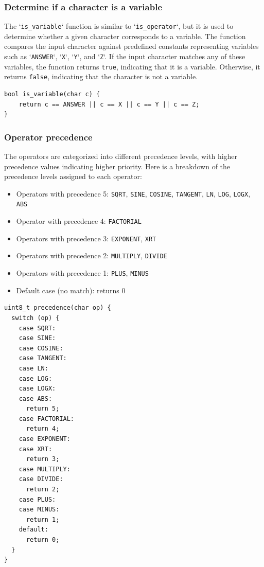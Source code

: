 \documentclass[a4paper, twoside]{report}
\begin{document}
\subsubsection{Determine if a character is a variable}
The `\texttt{is\_variable}` function is similar to `\texttt{is\_operator}`, but it is used to determine whether a given character corresponds to a variable. The function compares the input character against predefined constants representing variables such as `\texttt{ANSWER}`, `\texttt{X}`, `\texttt{Y}`, and `\texttt{Z}`. If the input character matches any of these variables, the function returns \texttt{true}, indicating that it is a variable. Otherwise, it returns \texttt{false}, indicating that the character is not a variable.
\begin{verbatim}
bool is_variable(char c) {
	return c == ANSWER || c == X || c == Y || c == Z;
}
\end{verbatim}

\subsubsection{Operator precedence}
The operators are categorized into different precedence levels, with higher precedence values indicating higher priority. Here is a breakdown of the precedence levels assigned to each operator:

\begin{itemize}
    \item Operators with precedence 5: \texttt{SQRT}, \texttt{SINE}, \texttt{COSINE}, \texttt{TANGENT}, \texttt{LN}, \texttt{LOG}, \texttt{LOGX}, \texttt{ABS}
    \item Operator with precedence 4: \texttt{FACTORIAL}
    \item Operators with precedence 3: \texttt{EXPONENT}, \texttt{XRT}
    \item Operators with precedence 2: \texttt{MULTIPLY}, \texttt{DIVIDE}
    \item Operators with precedence 1: \texttt{PLUS}, \texttt{MINUS}
    \item Default case (no match): returns 0
\end{itemize}

\begin{verbatim}
uint8_t precedence(char op) {
  switch (op) {
    case SQRT:
    case SINE:
    case COSINE:
    case TANGENT:
    case LN:
    case LOG:
    case LOGX:
    case ABS:
      return 5;
    case FACTORIAL:
      return 4;
    case EXPONENT:
    case XRT:
      return 3;
    case MULTIPLY:
    case DIVIDE:
      return 2;
    case PLUS:
    case MINUS:
      return 1;
    default:
      return 0;
  }
}
\end{verbatim}
\end{document}
